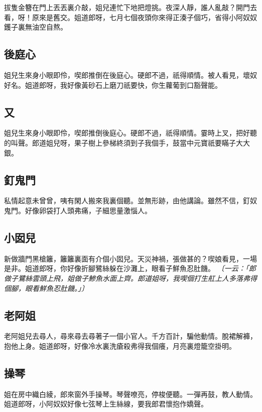 拔隻金簪在門上丟丟裏介敲，姐兒連忙下地把燈挑。夜深人靜，誰人亂敲？開門去看，呀！原來是舊交。姐道郎呀，七月七個夜頭你來得正湊子個巧，省得小阿奴奴鑊子裏無油空自熬。

\subsection*{後庭心}

姐兒生來身小眼即伶，喫郎推倒在後庭心。硬郎不過，祇得順情。被人看見，壞奴好名。姐道郎呀，我好像黃砂石上磨刀祇要快，你生蘿葡到口豁聲能。

\subsection*{又}

姐兒生來身小眼即伶，喫郎推倒後庭心。硬郎不過，祇得順情。霎時上叉，把好聽的叫聲。郎道姐兒呀，果子樹上參梯終須到子我個手，鼓當中元寶祇要瞞子大大銀。

\subsection*{釘鬼門}

私情起意未曾曾，咦有閑人搬來我裏個聽。並無形跡，由他講論。雖然不信，釘奴鬼門。好像卵袋打人頭弗痛，子細思量激惱人。

\subsection*{小囡兒}

新做牆門黑槍籬，籬籬裏面有介個小囡兒。天災神禍，張做甚的？喫娘看見，一場是非。姐道郎呀，你好像折腳鷺絲躲在沙灘上，眼看子鮮魚忍肚饑。
\textit{〔一云：「郎做子鷺絲雲頭上飛，姐做子鯵魚水面上齊。郎道姐呀，我喫個打生舡上人多落弗得個腳，眼看鮮魚忍肚饑。」〕}

\subsection*{老阿姐}

老阿姐兒去尋人，尋來尋去尋著子一個小官人。千方百計，騙他動情。脫裙解褲，抱他上身。姐道郎呀，好像冷水裏洗瘡殺弗得我個癢，月亮裏燈籠空掛明。

\subsection*{操琴}

姐在房中織白綾，郎來窗外手操琴。琴聲嘹亮，停梭便聽。一彈再鼓，教人動情。姐道郎呀，小阿奴奴好像七弦琴上生絲線，要我郎君懷抱作嬌聲。

